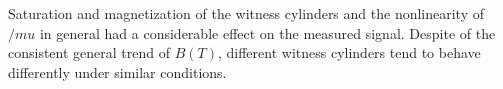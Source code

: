 Saturation and magnetization of the witness cylinders and the nonlinearity of $/mu$ in general had
a considerable effect on the measured signal. Despite of the
consistent general trend of $B(T)$, different witness cylinders tend
to behave differently under similar conditions. 












